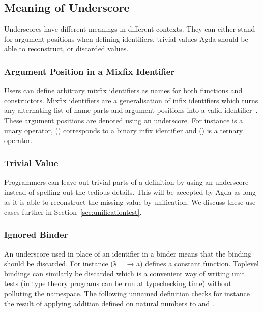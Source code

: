 
\subsection{Meaning of Underscore}

Underscores have different meanings in different contexts. They can either stand
for argument positions when defining identifiers, trivial values Agda should be
able to reconstruct, or discarded values.

\subsubsection{Argument Position in a Mixfix Identifier}

Users can define arbitrary mixfix identifiers as names for both functions and
constructors. Mixfix identifiers are a generalisation of infix identifiers
which turns any alternating list of name parts and argument positions into a
valid identifier~\cite{DBLP:conf/ifl/DanielssonN08}. These argument positions
are denoted using an underscore. For instance  is a unary operator,
(\AIC{\_::\_}) corresponds to a binary infix identifier and () is a
ternary operator.

\subsubsection{Trivial Value}

Programmers can leave out trivial parts of a definition by using an underscore
instead of spelling out the tedious details. This will be accepted by Agda as
long as it is able to reconstruct the missing value by unification. We discuss
these use cases further in Section~\ref{sec:unificationtest}.

\subsubsection{Ignored Binder}

An underscore used in place of an identifier in a binder means that the binding
should be discarded. For instance {(λ \_ → a)} defines a constant function.
Toplevel bindings can similarly be discarded which is a convenient way of
writing unit tests (in type theory programs can be run at typechecking time)
without polluting the namespace. The following unnamed definition checks for
instance the result of applying addition defined on natural numbers to
 and .

